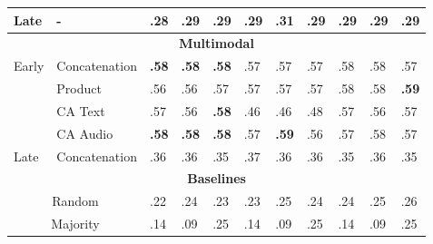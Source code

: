 \documentclass{article}
\begin{document}
\begin{table}[h]
\begin{tabular}{|lllllllllll|}
\multicolumn{1}{|l|}{Late}                   & \multicolumn{1}{l|}{-}             & .28          & .29          & \multicolumn{1}{l|}{.29}             & .29          & .31          & \multicolumn{1}{l|}{.29}             & .29          & .29          & .29          \\ \hline
\multicolumn{11}{|c|}{\textbf{Multimodal}}                                                                                                                                                                                                                         \\ \hline
\multicolumn{1}{|l|}{\multirow{4}{*}{Early}} & \multicolumn{1}{l|}{Concatenation} & \textbf{.58} & \textbf{.58} & \multicolumn{1}{l|}{\textbf{.58}} & .57          & .57          & \multicolumn{1}{l|}{.57}          & .58          & .58          & .57          \\
\multicolumn{1}{|l|}{}                       & \multicolumn{1}{l|}{Product}       & .56          & .56          & \multicolumn{1}{l|}{.57}          & .57          & .57          & \multicolumn{1}{l|}{.57}          & .58          & .58          & \textbf{.59} \\
\multicolumn{1}{|l|}{}                       & \multicolumn{1}{l|}{CA Text}       & .57          & .56          & \multicolumn{1}{l|}{\textbf{.58}} & .46          & .46          & \multicolumn{1}{l|}{.48}          & .57          & .56          & .57          \\
\multicolumn{1}{|l|}{}                       & \multicolumn{1}{l|}{CA Audio}      & \textbf{.58} & \textbf{.58} & \multicolumn{1}{l|}{\textbf{.58}} & .57          & \textbf{.59} & \multicolumn{1}{l|}{.56}          & .57          & .58          & .57          \\ \hline
\multicolumn{1}{|l|}{Late}                   & \multicolumn{1}{l|}{Concatenation} & .36          & .36          & \multicolumn{1}{l|}{.35}          & .37          & .36          & \multicolumn{1}{l|}{.36}          & .35          & .36          & .35          \\ \hline
\multicolumn{11}{|c|}{\textbf{Baselines}}                                                                                                                                                                                                                          \\ \hline
\multicolumn{2}{|c|}{Random}                                                      & .22          & .24          & \multicolumn{1}{l|}{.23}          & .23          & .25          & \multicolumn{1}{l|}{.24}          & .24          & .25          & .26          \\
\multicolumn{2}{|c|}{Majority}                                                    & .14          & .09          & \multicolumn{1}{l|}{.25}          & .14          & .09          & \multicolumn{1}{l|}{.25}          & .14          & .09          & .25          \\ \hline
\end{tabular}
\end{table}
\end{document}
